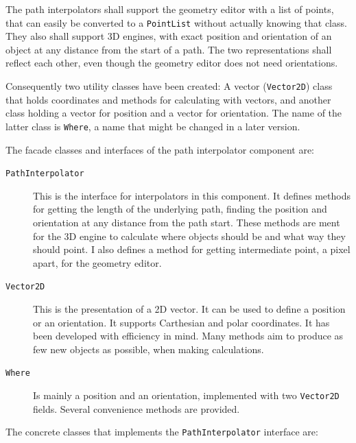 The path interpolators shall support the geometry editor with a list of points, that can easily be 
converted to a \texttt{PointList} without actually knowing that class. They also shall support 3D engines,
with exact position and orientation of an object at any distance from the start of a path. The two
representations shall reflect each other, even though the geometry editor does not need orientations.

Consequently two utility classes have been created: A vector (\texttt{Vector2D}) class that holds coordinates
and methods for calculating with vectors, and another class holding a vector for position and a vector for orientation.
The name of the latter class is \texttt{Where}, a name that might be changed in a later version.

The facade classes and interfaces of the path interpolator component are:

\begin{description}
  \item[\texttt{PathInterpolator}] This is the interface for interpolators in this component. It defines methods for getting the
      length of the underlying path, finding the position and orientation at any distance from the path start. These methods are 
      ment for the 3D engine to calculate where objects should be and what way they should point. I also defines a method
  	for getting intermediate point, a pixel apart, for the geometry editor. 
  \item[\texttt{Vector2D}] This is the presentation of a 2D vector. It can be used to define a position or an orientation. It supports
    Carthesian and polar coordinates. It has been developed with efficiency in mind. Many methods aim to produce as
    few new objects as possible, when making calculations.
  \item[\texttt{Where}] Is mainly a position and an orientation, implemented with two \texttt{Vector2D} fields.
    Several convenience methods are provided. 
\end{description} 

The concrete classes that implements the \texttt{PathInterpolator} interface are:

